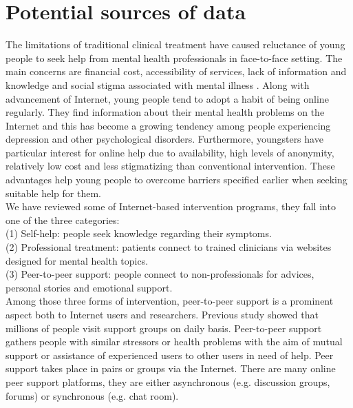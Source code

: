 \section{Potential sources of data}
The limitations of traditional clinical treatment have caused reluctance of young people to seek help from mental health professionals in face-to-face setting. The main concerns are financial cost, accessibility of services, lack of information and knowledge and social stigma associated with mental illness \cite{Rickwood2005}. Along with advancement of Internet, young people tend to adopt a habit of being online regularly. They find information about their mental health problems on the Internet and this has become a growing tendency among people experiencing depression and other psychological disorders. Furthermore, youngsters have particular interest for online help due to availability, high levels of anonymity, relatively low cost and less stigmatizing than conventional intervention. These advantages help young people to overcome barriers specified earlier when seeking suitable help for them.\\
We have reviewed some of Internet-based intervention programs, they fall into one of the three categories: \\
(1) Self-help: people seek knowledge regarding their symptoms. \\
(2) Professional treatment: patients connect to trained clinicians via websites designed for mental health topics. \\
(3) Peer-to-peer support: people connect to non-professionals for advices, personal stories and emotional support.\\
Among those three forms of intervention, peer-to-peer support is a prominent aspect both to Internet users and researchers. Previous study showed that millions of people visit support groups on daily basis. Peer-to-peer support gathers people with similar stressors or health problems with the aim of mutual support or assistance of experienced users to other users in need of help. Peer support takes place in pairs or groups via the Internet. There are many online peer support platforms, they are either asynchronous (e.g. discussion groups, forums) or synchronous (e.g. chat room).\\
